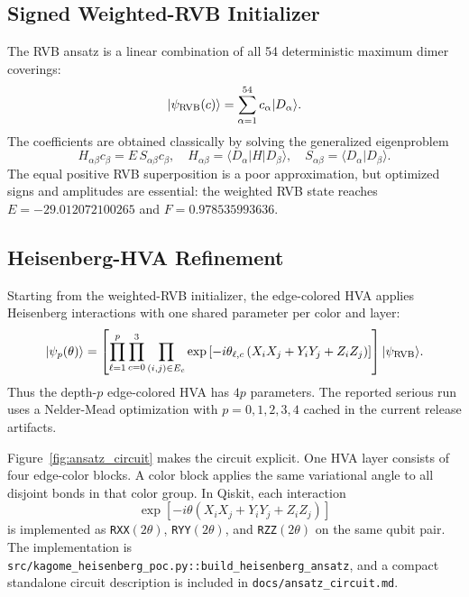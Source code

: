 \documentclass[11pt]{article}
\newcommand{\rvbE}{-29.012072100265}
\newcommand{\rvbF}{0.978535993636}
\begin{document}
\subsection{Signed Weighted-RVB Initializer}

The RVB ansatz is a linear combination of all 54 deterministic maximum dimer coverings:
\begin{equation}
|\psi_{\rm RVB}(c)\rangle =
\sum_{\alpha=1}^{54} c_\alpha |D_\alpha\rangle .
\end{equation}
The coefficients are obtained classically by solving the generalized eigenproblem
\begin{equation}
H_{\alpha\beta}c_\beta = E\,S_{\alpha\beta}c_\beta,
\quad
H_{\alpha\beta}=\langle D_\alpha|H|D_\beta\rangle,
\quad
S_{\alpha\beta}=\langle D_\alpha|D_\beta\rangle.
\end{equation}
The equal positive RVB superposition is a poor approximation, but optimized signs and amplitudes are essential: the weighted RVB state reaches $E=\rvbE$ and $F=\rvbF$.

\subsection{Heisenberg-HVA Refinement}

Starting from the weighted-RVB initializer, the edge-colored HVA applies Heisenberg interactions with one shared parameter per color and layer:
\begin{equation}
|\psi_p(\theta)\rangle =
\left[
\prod_{\ell=1}^{p}
\prod_{c=0}^{3}
\prod_{(i,j)\in E_c}
\exp\left[-i\theta_{\ell,c}\left(X_iX_j+Y_iY_j+Z_iZ_j\right)\right]
\right]
|\psi_{\rm RVB}\rangle .
\label{eq:hva}
\end{equation}
Thus the depth-$p$ edge-colored HVA has $4p$ parameters.  The reported serious run uses a Nelder-Mead optimization with $p=0,1,2,3,4$ cached in the current release artifacts.

Figure~\ref{fig:ansatz_circuit} makes the circuit explicit.  One HVA layer consists of four edge-color blocks.  A color block applies the same variational angle to all disjoint bonds in that color group.  In Qiskit, each interaction
\[
\exp[-i\theta(X_iX_j+Y_iY_j+Z_iZ_j)]
\]
is implemented as \texttt{RXX}$(2\theta)$, \texttt{RYY}$(2\theta)$, and \texttt{RZZ}$(2\theta)$ on the same qubit pair.  The implementation is \texttt{src/kagome\_heisenberg\_poc.py::build\_heisenberg\_ansatz}, and a compact standalone circuit description is included in \texttt{docs/ansatz\_circuit.md}.
\end{document}
